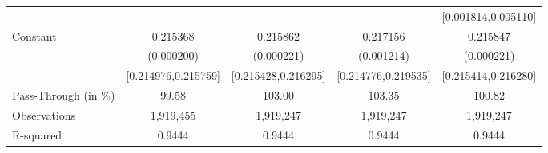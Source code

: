 {\begin{tabular}{l*{4}{c}}
                    &                     &                     &                     &[0.001814,0.005110]         \\
Constant            &    0.215368\sym{***}&    0.215862\sym{***}&    0.217156\sym{***}&    0.215847\sym{***}\\
                    &  (0.000200)         &  (0.000221)         &  (0.001214)         &  (0.000221)         \\
                    &[0.214976,0.215759]         &[0.215428,0.216295]         &[0.214776,0.219535]         &[0.215414,0.216280]         \\
\midrule
Pass-Through (in \%)&       99.58         &      103.00         &      103.35         &      100.82         \\
Observations        &   1,919,455         &   1,919,247         &   1,919,247         &   1,919,247         \\
R-squared           &      0.9444         &      0.9444         &      0.9444         &      0.9444         \\
\bottomrule
\end{tabular}
}
